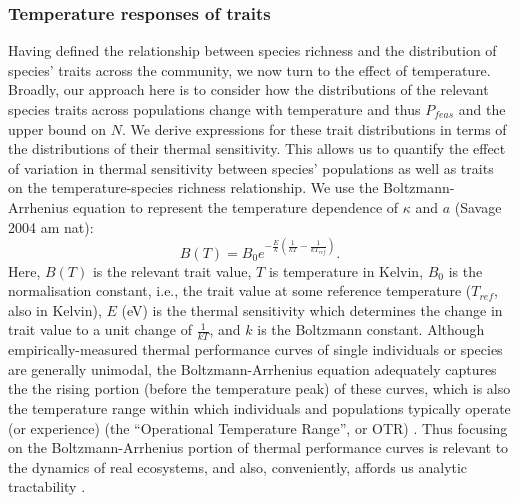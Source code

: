 \documentclass{article}
\begin{document}
\subsubsection*{Temperature responses of traits} \label{SEC:Temperature}
Having defined the relationship between species richness and the distribution of species' traits across the community, we now turn to the effect of temperature. Broadly, our approach here is to consider how the distributions of the relevant species traits across populations change with temperature and thus $P_{feas}$ and the upper bound on $N$. We derive expressions for these trait distributions in terms of the distributions of their thermal sensitivity. This allows us to quantify the effect of variation in thermal sensitivity between species' populations as well as traits on the temperature-species richness relationship. We use the Boltzmann-Arrhenius equation to represent the temperature dependence of $\kappa$ and $a$ (Savage 2004 am nat):
\begin{equation} \label{EQ:Boltzmann}
    B(T) = B_0 e^{-\frac{E}{k} \left(\frac{1}{kT} - \frac{1}{k T_{ref} }\right)}.
\end{equation}
Here, $B(T)$ is the relevant trait value,  $T$ is temperature in Kelvin, $B_0$ is the normalisation constant, i.e., the trait value at some reference temperature ($T_{ref}$, also in Kelvin), $E$ (eV) is the thermal sensitivity which determines the change in trait value to a unit change of $\frac{1}{kT}$, and $k$ is the Boltzmann constant. Although empirically-measured thermal performance curves of single individuals or species are generally unimodal, the Boltzmann-Arrhenius equation adequately captures the the rising portion (before the temperature peak) of these curves, which is also the temperature range within which individuals and populations typically operate (or experience) (the ``Operational Temperature Range'', or OTR) \cite{Dell2011}. Thus focusing on the Boltzmann-Arrhenius portion of thermal performance curves is relevant to the dynamics of real ecosystems, and also, conveniently, affords us analytic tractability . 
\end{document}
